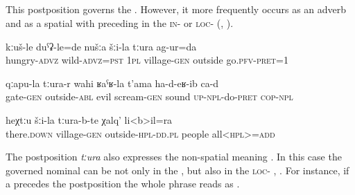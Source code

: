 
\subsection{ }
\label{ssec:postposition tura}

This postposition governs the  . However, it more frequently occurs as an adverb and as a spatial  with preceding  in the \textsc{in}- or \textsc{loc}- (, ).

\begin{exe}
	\ex
	\begin{xlist}
		\ex	\label{Hungry and wild, we went out of the village}
		\gll	kːuš-le	duˁʡ-le=de	nušːa	šːi-la	tːura	ag-ur=da  \\
			hungry-\textsc{advz}	wild-\textsc{advz}=\textsc{pst}	\textsc{1pl}	village-\textsc{gen}	outside	go.\textsc{pfv}-\textsc{pret}=1\\
		\glt	{}

		\ex	\label{From outside the gates an evil scream was made}
		\gll	qːapu-la	tːura-r	wahi	ʁaˁʁ-la	t'ama	ha-d-eʁ-ib ca-d\\
			gate-\textsc{gen}	outside-\textsc{abl}	evil	scream-\textsc{gen}	sound	\textsc{up}-\textsc{npl}-do-\textsc{pret} \textsc{cop-npl}\\
		\glt	{}

		\ex	\label{also all people outside of the villag}
		\gll	heχtːu	šːi-la	tːura-b-te	χalq'	li<b>il=ra\\
			there.\textsc{down}	village-\textsc{gen}	outside-\textsc{hpl}-\textsc{dd.pl} 	people	all<\textsc{hpl}>=\textsc{add}\\
		\glt	{}
	\end{xlist}
\end{exe}

The postposition \textit{tːura} also expresses the non-spatial meaning . In this case the governed nominal can be not only in the  , but also in the \textsc{loc}- , . For instance, if a  precedes the postposition the whole phrase reads as .

